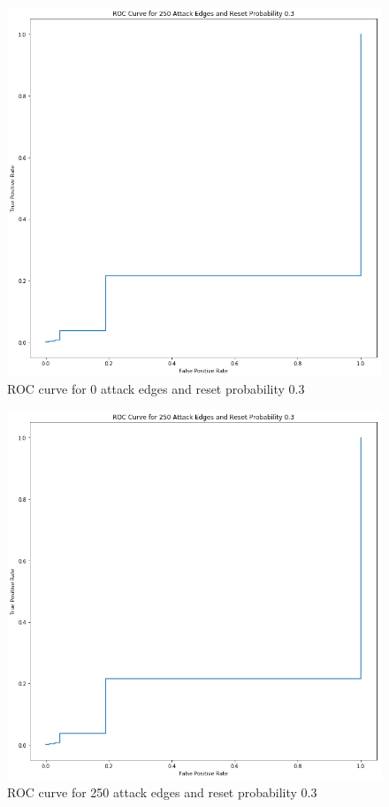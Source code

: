 \documentclass[twocolumn]{article}
\theoremstyle{definition}
\theoremstyle{theorem}
\begin{document}
\begin{figure}
\includegraphics[scale=0.3]{ROCCurve1}
\caption{ROC curve for 0 attack edges and reset probability 0.3}
\label{fig:ROCCurve1}
\end{figure}

\begin{figure}
\includegraphics[scale=0.3]{ROCCurve2}
\caption{ROC curve for 250 attack edges and reset probability 0.3}
\label{fig:ROCCurve2}
\end{figure}
\end{document}
